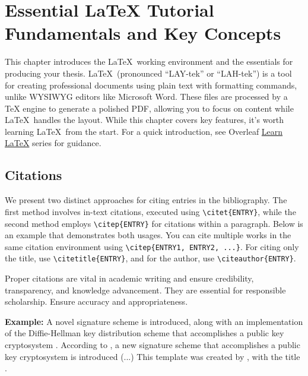 \chapter[Essential LaTeX Tutorial: Fundamentals and Key Concepts]{Essential LaTeX Tutorial Fundamentals and Key Concepts}
\label{cp:latex-tutorial}

This chapter introduces the \LaTeX~working environment and the essentials for producing your thesis. \LaTeX~(pronounced ``LAY-tek'' or ``LAH-tek'') is a tool for creating professional documents using plain text with formatting commands, unlike WYSIWYG editors like Microsoft Word. These files are processed by a TeX engine to generate a polished PDF, allowing you to focus on content while \LaTeX~handles the layout. While this chapter covers key features, it's worth learning \LaTeX~from the start. For a quick introduction, see Overleaf \href{https://www.overleaf.com/learn/latex/Learn_LaTeX_in_30_minutes}{Learn LaTeX} series for guidance.

\section{Citations}
\label{sec:citations}
We present two distinct approaches for citing entries in the bibliography. The first method involves in-text citations, executed using \verb|\citet{ENTRY}|, while the second method employs \verb|\citep{ENTRY}| for citations within a paragraph. Below is an example that demonstrates both usages. You can cite multiple works in the same citation environment using \verb|\citep{ENTRY1, ENTRY2, ...}|. For citing only the title, use \verb|\citetitle{ENTRY}|, and for the author, use \verb|\citeauthor{ENTRY}|.

\begin{block}[tip]
Proper citations are vital in academic writing and ensure credibility, transparency, and knowledge advancement. They are essential for responsible scholarship. Ensure accuracy and appropriateness.
\end{block}

\noindent\textbf{Example:} A novel signature scheme is introduced, along with an implementation of the Diffie-Hellman key distribution scheme that accomplishes a public key cryptosystem \citep{Elgamal1985}. According to \citet{Elgamal1985}, a new signature scheme that accomplishes a public key cryptosystem is introduced (...) This template was created by \citeauthor{Report}, with the title .

